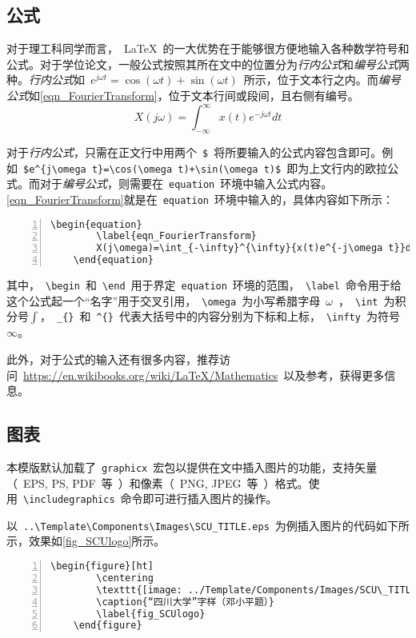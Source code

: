 \subsection{公式}
\label{Subsect_InsertFormula}
对于理工科同学而言，~\LaTeX~的一大优势在于能够很方便地输入各种数学符号和公式。对于学位论文，一般公式按照其所在文中的位置分为\emph{行内公式}和\emph{编号公式}两种。\emph{行内公式}如~$e^{j\omega t}=\cos(\omega t)+\sin(\omega t)$~所示，位于文本行之内。而\emph{编号公式}如\cref{eqn_FourierTransform}，位于文本行间或段间，且右侧有编号。
\begin{equation}
	\label{eqn_FourierTransform}
	X(j\omega)=\int_{-\infty}^{\infty}{x(t)e^{-j\omega t}}dt
\end{equation}


对于\emph{行内公式}，只需在正文行中用两个~\verb|$|~将所要输入的公式内容包含即可。例如~\verb|$e^{j\omega t}=\cos(\omega t)+\sin(\omega t)$|~即为上文行内的欧拉公式。而对于\emph{编号公式}，则需要在~\verb|equation|~环境中输入公式内容。\cref{eqn_FourierTransform}就是在~\verb|equation|~环境中输入的，具体内容如下所示：
\begin{Verbatim}[gobble=1,frame=single,numbers=left]
	\begin{equation}
		\label{eqn_FourierTransform}
		X(j\omega)=\int_{-\infty}^{\infty}{x(t)e^{-j\omega t}}dt
	\end{equation}
\end{Verbatim}
其中，~\verb|\begin|~和~\verb|\end|~用于界定~\verb|equation|~环境的范围，~\verb|\label|~命令用于给这个公式起一个“名字”用于交叉引用，~\verb|\omega|~为小写希腊字母~$\omega$~，~\verb|\int|~为积分号$\int$，~\verb|_{}|~和~\verb|^{}|~代表大括号中的内容分别为下标和上标，~\verb|\infty|~为符号$\infty$。


此外，对于公式的输入还有很多内容，推荐访问~\url{https://en.wikibooks.org/wiki/LaTeX/Mathematics}~以及参考，获得更多信息。

\subsection{图表}
\label{Subsect_InsertFigureTable}
本模版默认加载了~\verb|graphicx|~宏包以提供在文中插入图片的功能，支持矢量（~EPS, PS, PDF~等~）和像素（~PNG, JPEG~等~）格式。使用~\verb|\includegraphics|~命令即可进行插入图片的操作。


以~\verb|..\Template\Components\Images\SCU_TITLE.eps|~为例插入图片的代码如下所示，效果如\cref{fig_SCUlogo}所示。

\begin{Verbatim}[gobble=1,frame=single,numbers=left]
	\begin{figure}[ht]
		\centering
		\texttt{[image: ../Template/Components/Images/SCU\_TITLE]}
		\caption{“四川大学”字样（邓小平题）}
		\label{fig_SCUlogo}
	\end{figure}
\end{Verbatim}


